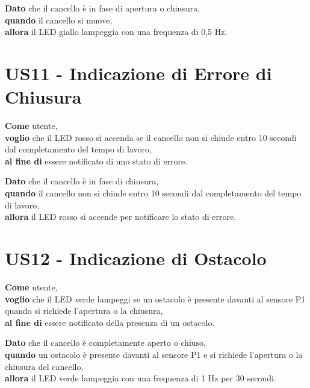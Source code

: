 \begin{tcolorbox}[title={Criterio di Accettazione}, colback=blue!20!white, colframe=blue!80!black]
    \textbf{Dato} che il cancello è in fase di apertura o chiusura, \\
    \textbf{quando} il cancello si muove, \\
    \textbf{allora} il LED giallo lampeggia con una frequenza di 0,5 Hz.
\end{tcolorbox}

\section{US11 - Indicazione di Errore di Chiusura}
    \begin{tcolorbox}[title={Descrizione}, colback=red!20!white, colframe=red!80!black]
    \textbf{Come} utente, \\
    \textbf{voglio} che il LED rosso si accenda se il cancello non si chiude entro 10 secondi dal completamento del tempo di lavoro, \\
    \textbf{al fine di} essere notificato di uno stato di errore.
\end{tcolorbox}

\begin{tcolorbox}[title={Criterio di Accettazione}, colback=blue!20!white, colframe=blue!80!black]
    \textbf{Dato} che il cancello è in fase di chiusura, \\
    \textbf{quando} il cancello non si chiude entro 10 secondi dal completamento del tempo di lavoro, \\
    \textbf{allora} il LED rosso si accende per notificare lo stato di errore.
\end{tcolorbox}

\section{US12 - Indicazione di Ostacolo}
\begin{tcolorbox}[title={Descrizione}, colback=red!20!white, colframe=red!80!black]
    \textbf{Come} utente, \\
    \textbf{voglio} che il LED verde lampeggi se un ostacolo è presente davanti al sensore P1 quando si richiede l'apertura o la chiusura, \\
    \textbf{al fine di} essere notificato della presenza di un ostacolo.
\end{tcolorbox}

\begin{tcolorbox}[title={Criterio di Accettazione}, colback=blue!20!white, colframe=blue!80!black]
    \textbf{Dato} che il cancello è completamente aperto o chiuso, \\
    \textbf{quando} un ostacolo è presente davanti al sensore P1 e si richiede l'apertura o la chiusura del cancello, \\
    \textbf{allora} il LED verde lampeggia con una frequenza di 1 Hz per 30 secondi.
\end{tcolorbox}

